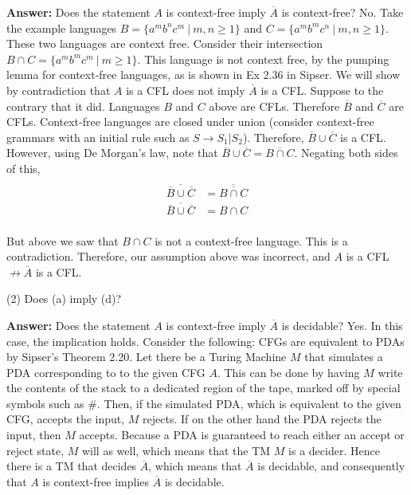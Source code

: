 \documentclass[11pt]{article}
\begin{document}
\begin{enumerate}[label=\textbf{Exercise \arabic{*}}]
        \textbf{Answer:} Does the statement $A$ is context-free imply $\overline{A}$ is context-free? No. Take the example languages $B = \{a^{m}b^{n}c^{m}\ \vert\ m,n \ge 1\}$ and $C = \{a^{m}b^{m}c^{n}\ \vert\ m,n \ge 1\}$. These two languages are context free. Consider their intersection $B \cap C = \{a^{m}b^{m}c^{m}\ \vert\ m \ge 1\}$. This language is not context free, by the pumping lemma for context-free languages, as is shown in Ex 2.36 in Sipser. We will show by contradiction that $A$ is a CFL does not imply $\overline{A}$ is a CFL. Suppose to the contrary that it did. Languages $B$ and $C$ above are CFLs. Therefore $\overline{B}$ and $\overline{C}$ are CFLs. Context-free languages are closed under union (consider context-free grammars with an initial rule such as $S \to S_1 | S_2$). Therefore, $\overline{B} \cup \overline{C}$ is a CFL. However, using De Morgan's law, note that $\overline{B} \cup \overline{C} = \overline{B \cap C}$. Negating both sides of this,
        \begin{align*}
           \\
          \overline{\overline{B} \cup \overline{C}} & = \overline{\overline{B \cap C}}\\
          \overline{\overline{B} \cup \overline{C}} &= B \cap C \\
        \end{align*}

        But above we saw that $B \cap C$ is not a context-free language. This is a contradiction. Therefore, our assumption above was incorrect, and $A$ is a CFL $\not\rightarrow \overline{A}$ is a CFL.

        (2) Does (a) imply (d)?

        \textbf{Answer:} Does the statement $A$ is context-free imply $\overline{A}$ is decidable? Yes. In this case, the implication holds. Consider the following: CFGs are equivalent to PDAs by Sipser's Theorem 2.20. Let there be a Turing Machine $M$ that simulates a PDA corresponding to to the given CFG $A$. This can be done by having $M$ write the contents of the stack to a dedicated region of the tape, marked off by special symbols such as $\#$. Then, if the simulated PDA, which is equivalent to the given CFG, accepts the input, $M$ rejects. If on the other hand the PDA rejects the input, then $M$ accepts. Because a PDA is guaranteed to reach either an accept or reject state, $M$ will as well, which means that the TM $M$ is a decider. Hence there is a TM that decides $\overline{A}$, which means that $\overline{A}$ is decidable, and consequently that $A$ is context-free implies $\overline{A}$ is decidable.


\end{enumerate}
\end{document}

